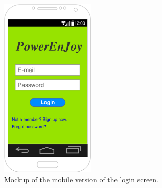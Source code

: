 \begin{figure}[H]
\begin{center}
		\includegraphics[width=0.4\textwidth]{./specific_requirements/features/diagrams/mobile_login.png}
		\caption{Mockup of the mobile version of the login screen.}
\end{center}
\end{figure}